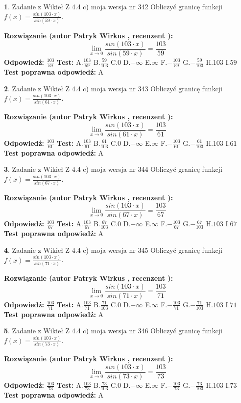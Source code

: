 \documentclass[12pt, a4paper]{article}
\theoremstyle{definition} %
\newtheorem{zad}{}
\newcommand{\zadStart}[1]{\begin{zad}#1\newline}
\newcommand{\zadStop}{\end{zad}}
\newcommand{\rozwStart}[2]{\noindent \textbf{Rozwiązanie (autor #1 , recenzent #2): }\newline}
\newcommand{\rozwStop}{\newline}
\newcommand{\odpStart}{\noindent \textbf{Odpowiedź:}\newline}
\newcommand{\odpStop}{\newline}
\newcommand{\testStart}{\noindent \textbf{Test:}\newline}
\newcommand{\testStop}{\newline}
\newcommand{\kluczStart}{\noindent \textbf{Test poprawna odpowiedź:}\newline}
\newcommand{\kluczStop}{\newline}
\begin{document}
\zadStart{Zadanie z Wikieł Z 4.4 c) moja wersja nr 342}
Obliczyć granicę funkcji $f(x)=\frac{sin(103\cdot x)}{sin(59\cdot x)}$.
\zadStop
\rozwStart{Patryk Wirkus}{}
$$\lim\limits_{x\to 0}\frac{sin(103\cdot x)}{sin(59\cdot x)}=
\frac{103}{59}$$
\rozwStop
\odpStart
$\frac{103}{59}$
\odpStop
\testStart
A.$\frac{103}{59}$
B.$\frac{59}{103}$
C.$0$
D.$-\infty$
E.$\infty$
F.$-\frac{103}{59}$
G.$-\frac{59}{103}$
H.$103$
I.$59$
\testStop
\kluczStart
A
\kluczStop



\zadStart{Zadanie z Wikieł Z 4.4 c) moja wersja nr 343}
Obliczyć granicę funkcji $f(x)=\frac{sin(103\cdot x)}{sin(61\cdot x)}$.
\zadStop
\rozwStart{Patryk Wirkus}{}
$$\lim\limits_{x\to 0}\frac{sin(103\cdot x)}{sin(61\cdot x)}=
\frac{103}{61}$$
\rozwStop
\odpStart
$\frac{103}{61}$
\odpStop
\testStart
A.$\frac{103}{61}$
B.$\frac{61}{103}$
C.$0$
D.$-\infty$
E.$\infty$
F.$-\frac{103}{61}$
G.$-\frac{61}{103}$
H.$103$
I.$61$
\testStop
\kluczStart
A
\kluczStop



\zadStart{Zadanie z Wikieł Z 4.4 c) moja wersja nr 344}
Obliczyć granicę funkcji $f(x)=\frac{sin(103\cdot x)}{sin(67\cdot x)}$.
\zadStop
\rozwStart{Patryk Wirkus}{}
$$\lim\limits_{x\to 0}\frac{sin(103\cdot x)}{sin(67\cdot x)}=
\frac{103}{67}$$
\rozwStop
\odpStart
$\frac{103}{67}$
\odpStop
\testStart
A.$\frac{103}{67}$
B.$\frac{67}{103}$
C.$0$
D.$-\infty$
E.$\infty$
F.$-\frac{103}{67}$
G.$-\frac{67}{103}$
H.$103$
I.$67$
\testStop
\kluczStart
A
\kluczStop



\zadStart{Zadanie z Wikieł Z 4.4 c) moja wersja nr 345}
Obliczyć granicę funkcji $f(x)=\frac{sin(103\cdot x)}{sin(71\cdot x)}$.
\zadStop
\rozwStart{Patryk Wirkus}{}
$$\lim\limits_{x\to 0}\frac{sin(103\cdot x)}{sin(71\cdot x)}=
\frac{103}{71}$$
\rozwStop
\odpStart
$\frac{103}{71}$
\odpStop
\testStart
A.$\frac{103}{71}$
B.$\frac{71}{103}$
C.$0$
D.$-\infty$
E.$\infty$
F.$-\frac{103}{71}$
G.$-\frac{71}{103}$
H.$103$
I.$71$
\testStop
\kluczStart
A
\kluczStop



\zadStart{Zadanie z Wikieł Z 4.4 c) moja wersja nr 346}
Obliczyć granicę funkcji $f(x)=\frac{sin(103\cdot x)}{sin(73\cdot x)}$.
\zadStop
\rozwStart{Patryk Wirkus}{}
$$\lim\limits_{x\to 0}\frac{sin(103\cdot x)}{sin(73\cdot x)}=
\frac{103}{73}$$
\rozwStop
\odpStart
$\frac{103}{73}$
\odpStop
\testStart
A.$\frac{103}{73}$
B.$\frac{73}{103}$
C.$0$
D.$-\infty$
E.$\infty$
F.$-\frac{103}{73}$
G.$-\frac{73}{103}$
H.$103$
I.$73$
\testStop
\kluczStart
A
\kluczStop
\end{document}
